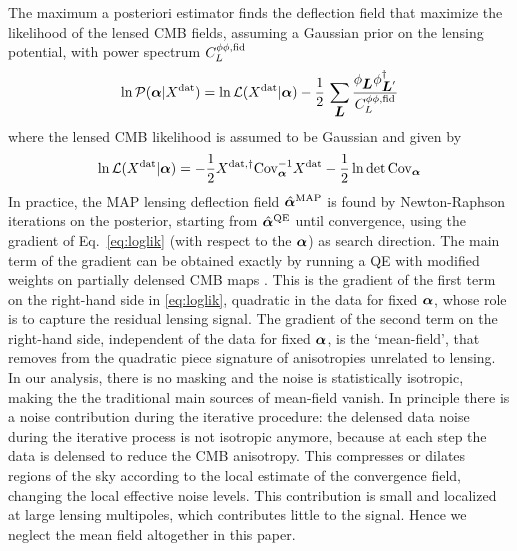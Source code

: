 \documentclass[prd, superscriptaddress, tightenlines, longbibliography, nofootinbib, eqsecnum, amsfonts, amsmath, floatfix, twocolumn, notitlepage]{revtex4-2}
\newcommand{\Cov}[0]{ {\rm{Cov}} }
\begin{document}
The maximum a posteriori estimator finds the deflection field that maximize the likelihood of the lensed CMB fields, assuming a Gaussian prior on the lensing potential, with power spectrum $C_L^{\phi\phi, \rm fid}$
\begin{equation}
    \ln \mathcal{P}({\boldsymbol{\alpha}} | X^{\rm dat}) = \ln \mathcal{L}( X^{\rm dat} | {\boldsymbol{\alpha}}) - \frac{1}{2} \, \sum_{\mbox{\boldmath{$L$}}} \frac{\phi_{\mbox{\boldmath{$L$}}} \phi_{{\mbox{\boldmath{$L$}}}'}^\dagger}{C_L^{\phi\phi, \rm fid}}
\end{equation}
where the lensed CMB likelihood is assumed to be Gaussian and given by 
\begin{equation}\label{eq:loglik}
    \ln \mathcal{L}( X^{\rm dat} | \valpha) = -\frac{1}{2} X^{\rm dat, \dagger }\Cov_\valpha^{-1} X^{\rm dat} - \frac{1}{2}\ln \det \Cov_\valpha
\end{equation}
In practice, the MAP lensing deflection field $\hat {{\boldsymbol{\alpha}}}^{\rm MAP}$ is found by Newton-Raphson iterations on the posterior, starting from $\hat {{\boldsymbol{\alpha}}}^{\rm QE}$ until convergence, using the gradient of Eq.~\eqref{eq:loglik} (with respect to the ${\boldsymbol{\alpha}}$) as search direction. The main term of the gradient can be obtained exactly by running a QE with modified weights on partially delensed CMB maps  \cite[see][for more details]{Carron:2017mqf}. This is the gradient of the first term on the right-hand side in \eqref{eq:loglik}, quadratic in the data for fixed ${\boldsymbol{\alpha}}$, whose role is to capture the residual lensing signal. The gradient of the second term on the right-hand side, independent of the data for fixed ${\boldsymbol{\alpha}}$, is the `mean-field', that removes from the quadratic piece signature of anisotropies unrelated to lensing. In our analysis, there is no masking and the noise is statistically isotropic, making the the traditional main sources of mean-field vanish. In principle there is a noise contribution during the iterative procedure: the delensed data noise during the iterative process is not isotropic anymore, because at each step the data is delensed to reduce the CMB anisotropy. This compresses or dilates regions of the sky according to the local estimate of the convergence field, changing the local effective noise levels. This contribution is small and localized at large lensing multipoles, which contributes little to the signal. Hence we neglect the mean field altogether in this paper. 
\end{document}
